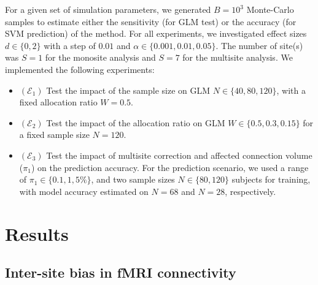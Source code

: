 \documentclass[authoryear]{elsarticle}
\begin{document}
For a given set of simulation parameters, we generated $B=10^3$ Monte-Carlo
samples to estimate either the sensitivity (for GLM test) or the accuracy (for
SVM prediction) of the method. For all experiments, we investigated effect sizes
$d\in\{0,2\}$ with a step of $0.01$ and $\alpha\in\{0.001,0.01,0.05\}$. The
number of site(s) was $S=1$ for the monosite analysis and $S=7$ for the
multisite analysis. We implemented the following experiments:

\begin{itemize}
\item $(\mathcal{E}_1)$ Test the impact of the sample size on GLM
$N\in\{40,80,120\}$, with a fixed allocation ratio $W=0.5$.
\item $(\mathcal{E}_2)$ Test the impact of the allocation ratio on GLM
$W\in\{0.5,0.3,0.15\}$ for a fixed sample size $N=120$.
\item $(\mathcal{E}_3)$ Test the impact of multisite correction and affected
connection volume ($\pi_1$) on the prediction accuracy. For the prediction
scenario, we used a range of $\pi_1\in\{0.1,1,5\%\}$, and two sample sizes
$N\in\{80,120\}$ subjects for training, with model accuracy estimated on $N=68$
and $N=28$, respectively.
\end{itemize}


\section{Results}

\subsection{Inter-site bias in fMRI connectivity}
\end{document}
